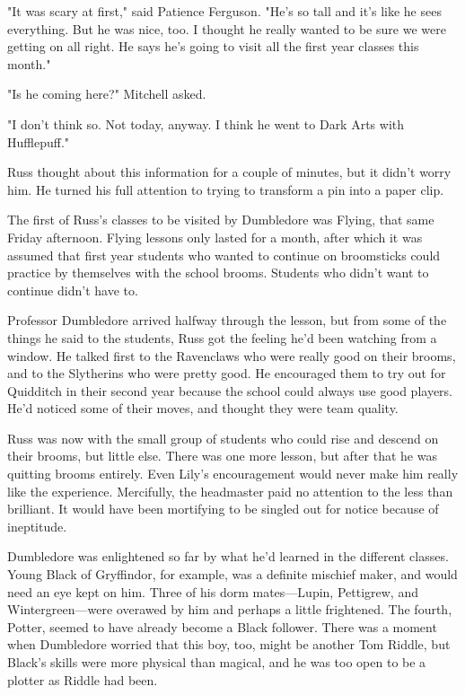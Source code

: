 "It was scary at first," said Patience Ferguson. "He's so tall and it's like he sees everything. But he was nice, too. I thought he really wanted to be sure we were getting on all right. He says he's going to visit all the first year classes this month."

"Is he coming here?" Mitchell asked.

"I don't think so. Not today, anyway. I think he went to Dark Arts with Hufflepuff."

Russ thought about this information for a couple of minutes, but it didn't worry him. He turned his full attention to trying to transform a pin into a paper clip.

The first of Russ's classes to be visited by Dumbledore was Flying, that same Friday afternoon. Flying lessons only lasted for a month, after which it was assumed that first year students who wanted to continue on broomsticks could practice by themselves with the school brooms. Students who didn't want to continue didn't have to.

Professor Dumbledore arrived halfway through the lesson, but from some of the things he said to the students, Russ got the feeling he'd been watching from a window. He talked first to the Ravenclaws who were really good on their brooms, and to the Slytherins who were pretty good. He encouraged them to try out for Quidditch in their second year because the school could always use good players. He'd noticed some of their moves, and thought they were team quality.

Russ was now with the small group of students who could rise and descend on their brooms, but little else. There was one more lesson, but after that he was quitting brooms entirely. Even Lily's encouragement would never make him really like the experience. Mercifully, the headmaster paid no attention to the less than brilliant. It would have been mortifying to be singled out for notice because of ineptitude.

Dumbledore was enlightened so far by what he'd learned in the different classes. Young Black of Gryffindor, for example, was a definite mischief maker, and would need an eye kept on him. Three of his dorm mates—Lupin, Pettigrew, and Wintergreen—were overawed by him and perhaps a little frightened. The fourth, Potter, seemed to have already become a Black follower. There was a moment when Dumbledore worried that this boy, too, might be another Tom Riddle, but Black's skills were more physical than magical, and he was too open to be a plotter as Riddle had been.

